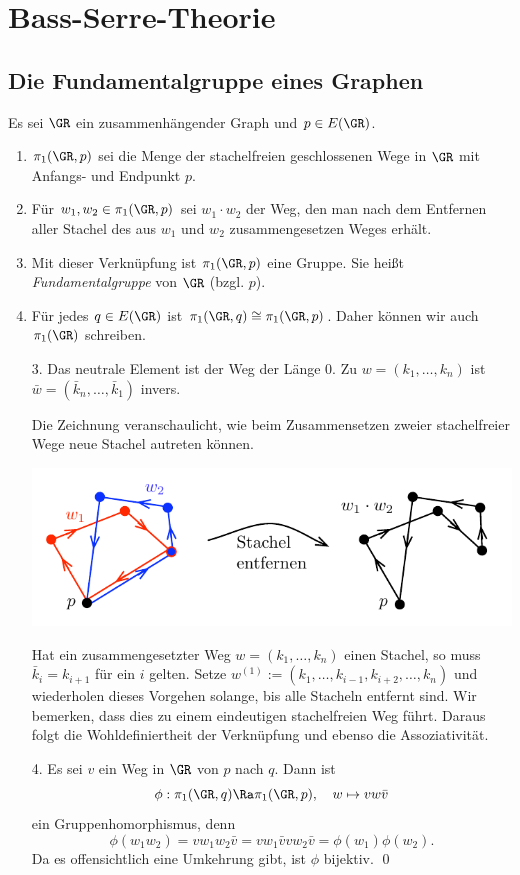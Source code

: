 \chapter{Bass-Serre-Theorie}

\section{Die Fundamentalgruppe eines Graphen}\label{sec_FG}

\DB Es sei $\GR$ ein zusammenhängender Graph und $p\in E(\GR)$.
\begin{enumerate}
\item $\pi_1(\GR,p)$ sei die Menge der stachelfreien geschlossenen
Wege in $\GR$ mit Anfangs- und Endpunkt $p$.
\item Für $w_1, w_2\in \pi_1(\GR,p)$ sei $w_1\cdot w_2$ der
Weg, den man nach dem Entfernen aller Stachel des aus $w_1$ und $w_2$
zusammengesetzen Weges erhält.
\item Mit dieser Verknüpfung ist $\pi_1(\GR,p)$ eine Gruppe.
Sie heißt \emph{Fundamentalgruppe}
von $\GR$ (bzgl. $p$).
\item Für jedes $q\in E(\GR)$ ist $\pi_1(\GR,q)\cong\pi_1(\GR,p)$.
Daher können wir auch $\pi_1(\GR)$ schreiben.
\end{enumerate}
\bew
\begin{itemize}
\item[3.] Das neutrale Element ist der Weg der Länge $0$.
Zu $w=(k_1,\ldots,k_n)$ ist
$\bar{w}=(\bar{k}_n,\ldots,\bar{k}_1)$ invers.

Die Zeichnung veranschaulicht, wie beim Zusammensetzen zweier
stachelfreier Wege neue Stachel autreten können.
\begin{center}
	\includegraphics{grugraImages/w1w2}
\end{center}
Hat ein zusammengesetzter Weg $w=(k_1,\ldots,k_n)$ einen Stachel,
so muss $\bar{k}_i=k_{i+1}$ für ein $i$ gelten.
Setze $w^{(1)}:=(k_1,\ldots,k_{i-1},k_{i+2},\ldots,k_n)$ und
wiederholen dieses Vorgehen solange, bis alle Stacheln entfernt sind.
Wir bemerken, dass dies zu einem eindeutigen stachelfreien Weg führt.
Daraus folgt die Wohldefiniertheit der Verknüpfung und ebenso die
Assoziativität.
\item[4.] Es sei $v$ ein Weg in $\GR$ von $p$ nach $q$. Dann ist
\[
\phi:\pi_1(\GR,q)\Ra\pi_1(\GR,p),\quad
w\mapsto vw\bar{v}
\]
ein Gruppenhomorphismus, denn
\[
\phi(w_1 w_2) = v w_1 w_2 \bar{v}
=v w_1 \bar{v} v w_2 \bar{v}
=\phi(w_1)\phi(w_2).
\]
Da es offensichtlich eine Umkehrung gibt, ist $\phi$ bijektiv.
\qed
\end{itemize}

